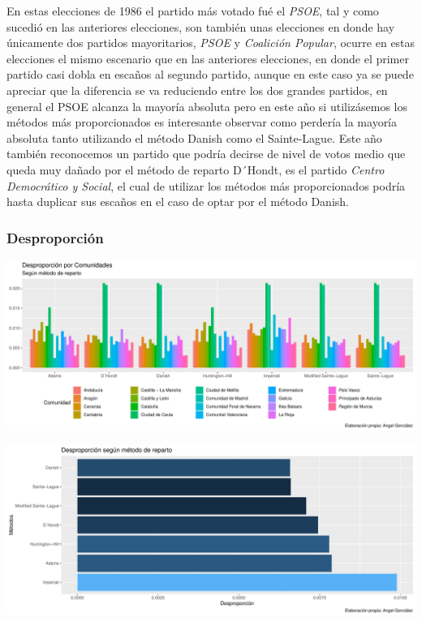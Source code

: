 \documentclass[12pt,a4paper,]{book}
\numberwithin{dummy}{section}
\theoremstyle{ocrenumbox}
\theoremstyle{blacknumex}
\theoremstyle{blacknumbox}
\theoremstyle{ocrenum}
\theoremstyle{ocrenum}
\begin{document}
En estas elecciones de 1986 el partido más votado fué el \emph{PSOE},
tal y como sucedió en las anteriores elecciones, son también unas
elecciones en donde hay únicamente dos partidos mayoritarios,
\emph{PSOE} y \emph{Coalición Popular}, ocurre en estas elecciones el
mismo escenario que en las anteriores elecciones, en donde el primer
partido casi dobla en escaños al segundo partido, aunque en este caso ya
se puede apreciar que la diferencia se va reduciendo entre los dos
grandes partidos, en general el PSOE alcanza la mayoría absoluta pero en
este año si utilizásemos los métodos más proporcionados es interesante
observar como perdería la mayoría absoluta tanto utilizando el método
Danish como el Sainte-Lague. Este año también reconocemos un partido que
podría decirse de nivel de votos medio que queda muy dañado por el
método de reparto D´Hondt, es el partido \emph{Centro Democrático y
Social}, el cual de utilizar los métodos más proporcionados podría hasta
duplicar sus escaños en el caso de optar por el método Danish.

\hypertarget{desproporciuxf3n-3}{%
\subsubsection{Desproporción}\label{desproporciuxf3n-3}}

\begin{center}\includegraphics[width=0.95\linewidth]{figurasR/unnamed-chunk-90-1} \end{center}

\begin{center}\includegraphics[width=0.95\linewidth]{figurasR/unnamed-chunk-90-2} \end{center}
\end{document}
